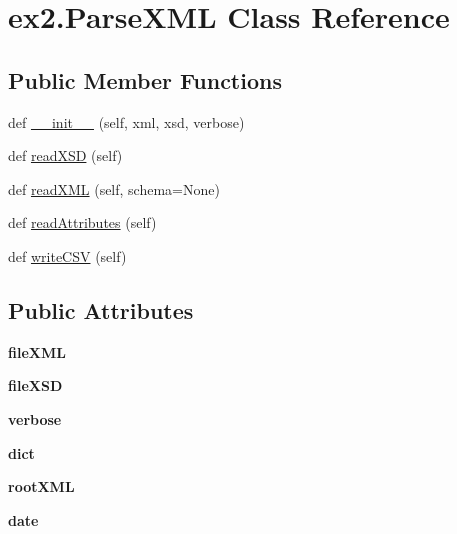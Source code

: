 \hypertarget{classex2_1_1ParseXML}{}\section{ex2.\+Parse\+X\+ML Class Reference}
\label{classex2_1_1ParseXML}
\subsection*{Public Member Functions}
\begin{DoxyCompactItemize}
\item 
def \hyperlink{classex2_1_1ParseXML_a34388961dd25cf9813e954854a06bf89}{\+\_\+\+\_\+init\+\_\+\+\_\+} (self, xml, xsd, verbose)
\item 
def \hyperlink{classex2_1_1ParseXML_a4895e49c1059c9aedd93f97c29eee30f}{read\+X\+SD} (self)
\item 
def \hyperlink{classex2_1_1ParseXML_a5525ea8efb94c0fd12c9100b04702c5b}{read\+X\+ML} (self, schema=None)
\item 
def \hyperlink{classex2_1_1ParseXML_ad085ab1449b4ae5d51fef904d759c73b}{read\+Attributes} (self)
\item 
def \hyperlink{classex2_1_1ParseXML_a87b2265b8dccd79ff09bd10ee2f8c269}{write\+C\+SV} (self)
\end{DoxyCompactItemize}
\subsection*{Public Attributes}
\begin{DoxyCompactItemize}
\item 
{\bfseries file\+X\+ML}\hypertarget{classex2_1_1ParseXML_ae06baa8c594f88a71490e8bafae1da37}{}\label{classex2_1_1ParseXML_ae06baa8c594f88a71490e8bafae1da37}

\item 
{\bfseries file\+X\+SD}\hypertarget{classex2_1_1ParseXML_a6075f0d21a2b394e7d6413347967b61e}{}\label{classex2_1_1ParseXML_a6075f0d21a2b394e7d6413347967b61e}

\item 
{\bfseries verbose}\hypertarget{classex2_1_1ParseXML_a903303a97ffb911574f691744978e7e5}{}\label{classex2_1_1ParseXML_a903303a97ffb911574f691744978e7e5}

\item 
{\bfseries dict}\hypertarget{classex2_1_1ParseXML_a782928ec4f5e8e20237621fb7a9178b7}{}\label{classex2_1_1ParseXML_a782928ec4f5e8e20237621fb7a9178b7}

\item 
{\bfseries root\+X\+ML}\hypertarget{classex2_1_1ParseXML_aae05e41a6c40855aa4bc78a80ba1f2be}{}\label{classex2_1_1ParseXML_aae05e41a6c40855aa4bc78a80ba1f2be}

\item 
{\bfseries date}\hypertarget{classex2_1_1ParseXML_a83d9af9a8df0ff6091822bccc1d6c236}{}\label{classex2_1_1ParseXML_a83d9af9a8df0ff6091822bccc1d6c236}

\end{DoxyCompactItemize}


